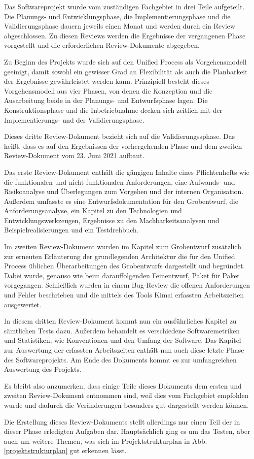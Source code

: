 \documentclass[../review_3.tex]{subfiles}
\begin{document}
Das Softwareprojekt wurde vom zuständigen Fachgebiet in drei Teile aufgeteilt. Die Planungs- und Entwicklungsphase, die Implementierungsphase und die Validierungsphase dauern jeweils einen Monat und werden durch ein Review abgeschlossen. Zu diesen Reviews werden die Ergebnisse der vergangenen Phase vorgestellt und die erforderlichen Review-Dokumente abgegeben.

Zu Beginn des Projekts wurde sich auf den Unified Process als Vorgehensmodell geeinigt, damit sowohl ein gewisser Grad an Flexibilität als auch die Planbarkeit der Ergebnisse gewährleistet werden kann. Prinzipiell besteht dieses Vorgehensmodell aus vier Phasen, von denen die Konzeption und die Ausarbeitung beide in der Planungs- und Entwurfsphase lagen. Die Konstruktionsphase und die Inbetriebnahme decken sich zeitlich mit der Implementierungs- und der Validierungsphase.

Dieses dritte Review-Dokument bezieht sich auf die Validierungssphase. Das heißt, dass es auf den Ergebnissen der vorhergehenden Phase und dem zweiten Review-Dokument vom 23. Juni 2021 aufbaut.

Das erste Review-Dokument enthält die gängigen Inhalte eines Pflichtenhefts wie die funktionalen und nicht-funktionalen Anforderungen, eine Aufwands- und Risikoanalyse und Überlegungen zum Vorgehen und der internen Organisation. Außerdem umfasste es eine Entwurfsdokumentation für den Grobentwurf, die Anforderungsanalyse, ein Kapitel zu den Technologien und Entwicklungswerkzeugen, Ergebnisse zu den Machbarkeitsanalysen und Beispielrealisierungen und ein Testdrehbuch.

Im zweiten Review-Dokument wurden im Kapitel zum Grobentwurf zusätzlich zur erneuten Erläuterung der grundlegenden Architektur die für den Unified Process üblichen Überarbeitungen des Grobentwurfs dargestellt und begründet. Dabei wurde, genauso wie beim darauffolgenden Feinentwurf, Paket für Paket vorgegangen. Schließlich wurden in einem Bug-Review die offenen Anforderungen und Fehler beschrieben und die mittels des Tools Kimai erfassten Arbeitszeiten ausgewertet.

In diesem dritten Review-Dokument kommt nun ein ausführliches Kapitel zu sämtlichen Tests dazu. Außerdem behandelt es verschiedene Softwaremetriken und Statistiken, wie Konventionen und den Umfang der Software. Das Kapitel zur Auswertung der erfassten Arbeitszeiten enthält nun auch diese letzte Phase des Softwareprojekts. Am Ende des Dokuments kommt es zur umfangreichen Auswertung des Projekts.

Es bleibt also anzumerken, dass einige Teile dieses Dokuments dem ersten und zweiten Review-Dokument entnommen sind, weil dies vom Fachgebiet empfohlen wurde und dadurch die Veränderungen besonders gut dargestellt werden können.

Die Erstellung dieses Review-Dokuments stellt allerdings nur einen Teil der in dieser Phase erledigten Aufgaben dar. Hauptsächlich ging es um das Testen, aber auch um weitere Themen, was sich im Projektstrukturplan in Abb. \ref{projektstrukturplan} gut erkennen lässt.
\end{document}
